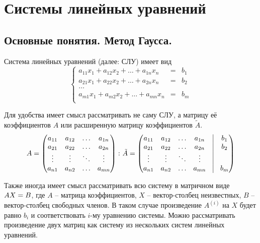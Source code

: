 \section{Системы линейных уравнений}
\label{slu}
%

\subsection{Основные понятия. Метод Гаусса.}

\begin{df}
  Система линейных уравнений (далее: СЛУ) имеет вид
  $$ 
    \left\{
      \begin{array}{cll}
      a_{11}x_1 + a_{12}x_2+\ldots+a_{1n}x_n & = & b_1\\
      a_{21}x_1 + a_{22}x_2+\ldots+a_{2n}x_n & = & b_2\\
      \ldots&&\\
      a_{m1}x_1 + a_{m2}x_2+\ldots+a_{mn}x_n & = & b_m\\
      \end{array}
    \right.
  $$
\end{df}

  Для удобства имеет смысл рассматривать не саму СЛУ, а матрицу её коэффициентов $A$ или расширенную матрицу коэффициентов $\tilde A$.
  $$
  A =
    \begin{pmatrix}
     a_{11}&a_{12}&\dots&a_{1n}\\
     a_{21}&a_{22}&\dots&a_{2n}\\
     \vdots&\vdots&\ddots&\vdots\\
     a_{n1}&a_{n2}&\dots&a_{mn}
    \end{pmatrix}
  \spc
  \tilde A =
    \begin{pmatrix}
     a_{11}&a_{12}&\dots&a_{1n}&\vline&b_1\\
     a_{21}&a_{22}&\dots&a_{2n}&\vline&b_2\\
     \vdots&\vdots&\ddots&\vdots&\vline&\\
     a_{n1}&a_{n2}&\dots&a_{mn}&\vline& b_m
    \end{pmatrix}
  $$
  
  Также иногда имеет смысл рассматривать всю систему в матричном виде $AX\bw=B$, где $A$ -- матрица коэффициентов, $X$ -- вектор-столбец неизвестных, $B$ -- вектор-столбец свободных членов. В таком случае произведение $A^{(i)}$ на $X$ будет равно $b_i$ и соответствовать $i$-му уравнению системы. Можно рассматривать произведение двух матриц как систему из нескольких систем линейных уравнений.
  
